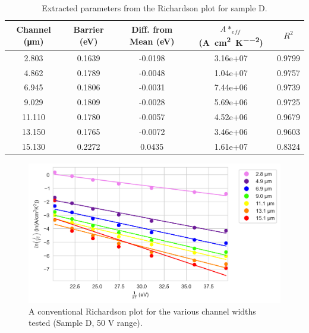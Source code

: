 \begin{table}[h]
    \centering
    \begin{tabular}{|c|c|c|c|c|}
        \hline
        Channel (\si{\micro\metre}) & Barrier (\si{\electronvolt}) & Diff. from Mean (\si{\electronvolt}) & $A*_{eff}$ (\si{\ampere\per\centi\metre\squared\per\kelvin\squared}) & $R^{2}$\\ \hline
        2.803 & 0.1639 & -0.0198 & 3.16e+07 &0.9799 \\ 
        4.862 & 0.1789 & -0.0048 & 1.04e+07 &0.9757 \\ 
        6.945 & 0.1806 & -0.0031 & 7.44e+06 &0.9739 \\ 
        9.029 & 0.1809 & -0.0028 & 5.69e+06 &0.9725 \\ 
        11.110 & 0.1780 & -0.0057 & 4.52e+06 &0.9679 \\ 
        13.150 & 0.1765 & -0.0072 & 3.46e+06 &0.9603 \\ 
        15.130 & 0.2272 & 0.0435 & 1.61e+07 &0.8324 \\ 
        \hline
    \end{tabular}
    \caption{Extracted parameters from the Richardson plot for sample D.}
    \label{tab:richardsonD_10V}
\end{table}

\begin{figure}[h]
    \centering
    \includegraphics[width=\textwidth]{Sample D 2019/50V_Richardson_Plot.png}
    \caption{A conventional Richardson plot for the various channel widths tested (Sample D, 50 V range).}
    \label{fig:richardsonD_50V}
\end{figure}

